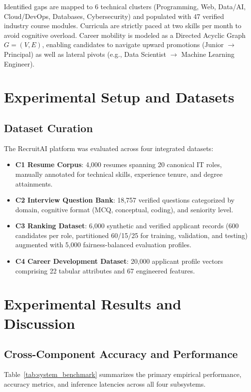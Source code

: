 \documentclass[conference]{IEEEtran}
\begin{document}
Identified gaps are mapped to 6 technical clusters (Programming, Web, Data/AI, Cloud/DevOps, Databases, Cybersecurity) and populated with 47 verified industry course modules. Curricula are strictly paced at two skills per month to avoid cognitive overload. Career mobility is modeled as a Directed Acyclic Graph $G = (V, E)$, enabling candidates to navigate upward promotions (Junior $\rightarrow$ Principal) as well as lateral pivots (e.g., Data Scientist $\rightarrow$ Machine Learning Engineer).

\section{Experimental Setup and Datasets}

\subsection{Dataset Curation}
The RecruitAI platform was evaluated across four integrated datasets:
\begin{itemize}
    \item \textbf{C1 Resume Corpus}: 4,000 resumes spanning 20 canonical IT roles, manually annotated for technical skills, experience tenure, and degree attainments.
    \item \textbf{C2 Interview Question Bank}: 18,757 verified questions categorized by domain, cognitive format (MCQ, conceptual, coding), and seniority level.
    \item \textbf{C3 Ranking Dataset}: 6,000 synthetic and verified applicant records (600 candidates per role, partitioned 60/15/25 for training, validation, and testing) augmented with 5,000 fairness-balanced evaluation profiles.
    \item \textbf{C4 Career Development Dataset}: 20,000 applicant profile vectors comprising 22 tabular attributes and 67 engineered features.
\end{itemize}

\section{Experimental Results and Discussion}

\subsection{Cross-Component Accuracy and Performance}
Table~\ref{tab:system_benchmark} summarizes the primary empirical performance, accuracy metrics, and inference latencies across all four subsystems.
\end{document}
